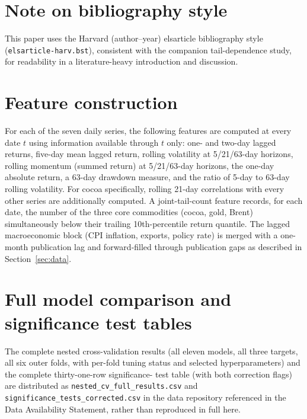 \documentclass[final,3p,times,authoryear]{elsarticle}
\begin{document}
\section*{Note on bibliography style}
This paper uses the Harvard (author--year) elsarticle bibliography
style (\texttt{elsarticle-harv.bst}), consistent with the companion
tail-dependence study, for readability in a literature-heavy
introduction and discussion.




\appendix

\section{Feature construction}
\label{app:features}

For each of the seven daily series, the following features are computed
at every date $t$ using information available through $t$ only: one-
and two-day lagged returns, five-day mean lagged return, rolling
volatility at 5/21/63-day horizons, rolling momentum (summed return) at
5/21/63-day horizons, the one-day absolute return, a 63-day drawdown
measure, and the ratio of 5-day to 63-day rolling volatility. For cocoa
specifically, rolling 21-day correlations with every other series are
additionally computed. A joint-tail-count feature records, for each
date, the number of the three core commodities (cocoa, gold, Brent)
simultaneously below their trailing 10th-percentile return quantile.
The lagged macroeconomic block (CPI inflation, exports, policy rate) is
merged with a one-month publication lag and forward-filled through
publication gaps as described in Section~\ref{sec:data}.

\section{Full model comparison and significance test tables}
\label{app:fulltables}

The complete nested cross-validation results (all eleven models, all
three targets, all six outer folds, with per-fold tuning status and
selected hyperparameters) and the complete thirty-one-row significance-
test table (with both correction flags) are distributed as
\texttt{nested\_cv\_full\_results.csv} and
\texttt{significance\_tests\_corrected.csv} in the data repository
referenced in the Data Availability Statement, rather than reproduced in
full here.
\end{document}
